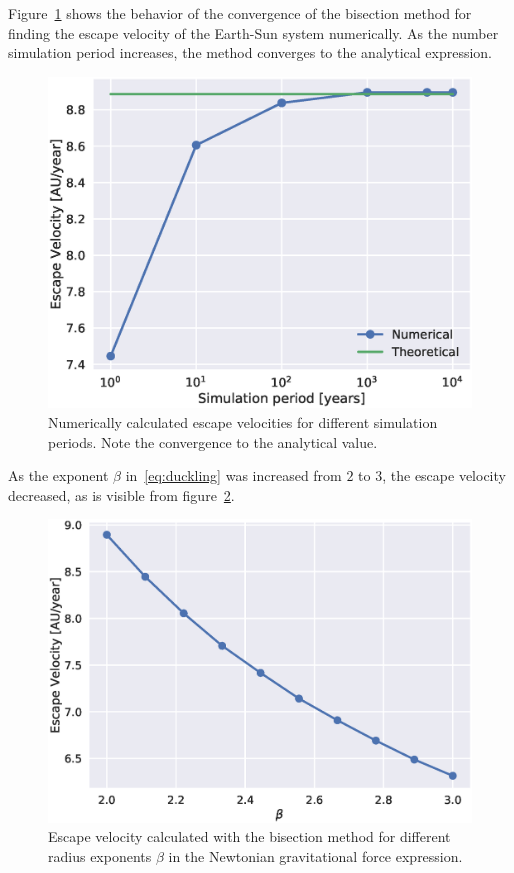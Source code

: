 \documentclass[aps,reprint]{revtex4-1}
\begin{document}
Figure~\ref{fig:escvel} shows the behavior of the convergence of the bisection
method for finding the escape velocity of the Earth-Sun system numerically. As
the number simulation period increases, the method converges to the analytical
expression.
\begin{figure}[H]
  \includegraphics[width=\columnwidth]{figures/escapevelocity.eps}
  \caption{Numerically calculated escape velocities for different simulation
  periods. Note the convergence to the analytical value.}
  \label{fig:escvel}
\end{figure}

As the exponent \(\beta\) in~\eqref{eq:duckling} was increased from \(2\) to
\(3\), the escape velocity decreased, as is visible from figure~\ref{fig:hei}.
\begin{figure}[H]
  \includegraphics[width=\columnwidth]{figures/escapevelocitybeta.eps}
  \caption{Escape velocity calculated with the bisection method for different
  radius exponents $\beta$ in the Newtonian gravitational force expression.}
  \label{fig:hei}
\end{figure}
\end{document}
